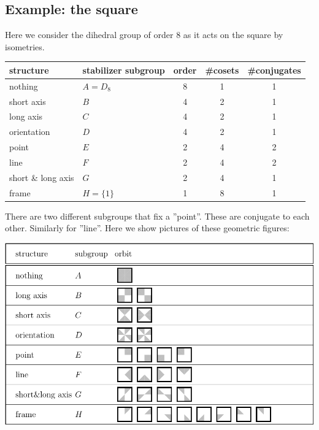 \documentclass[11pt,oneside]{article}
\begin{document}
\subsection{Example: the square}

Here we consider the dihedral group of order 8 as
it acts on the square by isometries.

\begin{samepage}
\begin{center}
\begin{tabular}{ |l|l|c|c|c| }
\hline
structure & stabilizer subgroup & order & \#cosets & \#conjugates \\
\hline
\hline
nothing & $A=D_8$ &       8        &  1      &   1         \\
\hline
short axis& $B$ &       4        &  2      &   1         \\
\hline
long axis & $C$ &       4        &  2      &   1         \\
\hline
orientation & $D$ &       4        &  2      &   1         \\
\hline
point & $E$ &       2        &  4      &   2         \\
\hline
line  & $F$ &       2        &  4      &   2         \\
\hline
short \& long axis & $G$ &       2        &  4      &   1         \\
\hline
frame & $H=\{1\} $ &       1        &  8      &   1         \\
\hline
\end{tabular}
\end{center}
\end{samepage}

There are two different subgroups that fix a ''point''.
These are conjugate to each other.
Similarly for ''line''.
Here we show pictures of these geometric figures:

\begin{center}
\includegraphics[]{pic-square-structures.pdf} 
\end{center}
\end{document}
